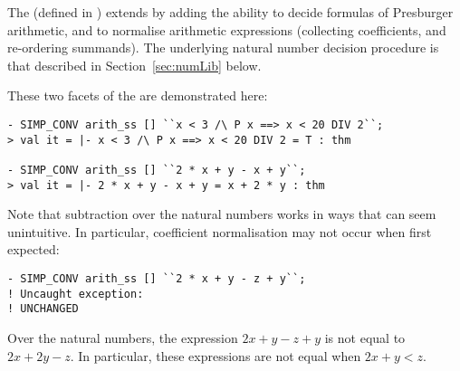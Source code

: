 \subsubsection{}
%
%
The  \simpset{} (defined in ) extends
 by adding the ability to decide formulas of Presburger
arithmetic, and to normalise arithmetic expressions (collecting
coefficients, and re-ordering summands).  The underlying natural
number decision procedure is that described in
Section~\ref{sec:numLib} below.

These two facets of the  \simpset{} are demonstrated
here:
\begin{session}
\begin{verbatim}
- SIMP_CONV arith_ss [] ``x < 3 /\ P x ==> x < 20 DIV 2``;
> val it = |- x < 3 /\ P x ==> x < 20 DIV 2 = T : thm

- SIMP_CONV arith_ss [] ``2 * x + y - x + y``;
> val it = |- 2 * x + y - x + y = x + 2 * y : thm
\end{verbatim}
\end{session}
Note that subtraction over the natural numbers works in ways that can
seem unintuitive.  In particular, coefficient normalisation may not
occur when first expected:
\begin{session}
\begin{verbatim}
- SIMP_CONV arith_ss [] ``2 * x + y - z + y``;
! Uncaught exception:
! UNCHANGED
\end{verbatim}
\end{session}
Over the natural numbers, the expression $2 x + y - z + y$ is not
equal to $2 x + 2 y - z$.  In particular, these expressions are not
equal when $2x + y < z$.


